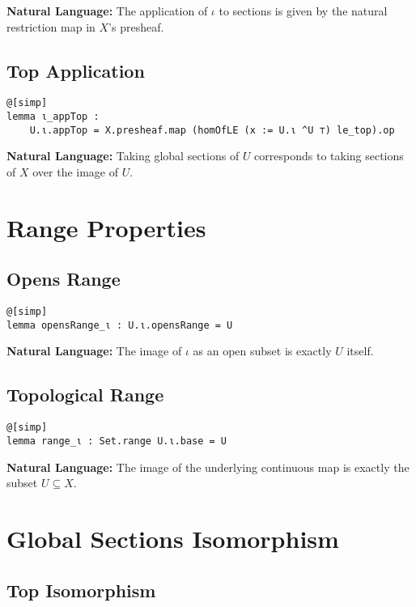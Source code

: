 \documentclass{article}
\theoremstyle{definition}
\begin{document}
\textbf{Natural Language:} The application of $\iota$ to sections is given by the natural restriction map in $X$'s presheaf.

\subsection{Top Application}

\begin{lstlisting}
@[simp]
lemma ι_appTop :
    U.ι.appTop = X.presheaf.map (homOfLE (x := U.ι ^U ⊤) le_top).op
\end{lstlisting}

\textbf{Natural Language:} Taking global sections of $U$ corresponds to taking sections of $X$ over the image of $U$.

\section{Range Properties}

\subsection{Opens Range}

\begin{lstlisting}
@[simp]
lemma opensRange_ι : U.ι.opensRange = U
\end{lstlisting}

\textbf{Natural Language:} The image of $\iota$ as an open subset is exactly $U$ itself.

\subsection{Topological Range}

\begin{lstlisting}
@[simp]
lemma range_ι : Set.range U.ι.base = U
\end{lstlisting}

\textbf{Natural Language:} The image of the underlying continuous map is exactly the subset $U \subseteq X$.

\section{Global Sections Isomorphism}

\subsection{Top Isomorphism}
\end{document}
